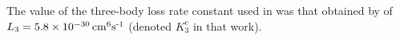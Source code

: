 The value of the three-body loss rate constant used in  was that obtained by \citet{Burt:1997fk} of $L_3 = \unit[5.8\times 10^{-30}]{cm\textsuperscript{6}s\textsuperscript{-1}}$ (denoted $K_3^{c}$ in that work).




